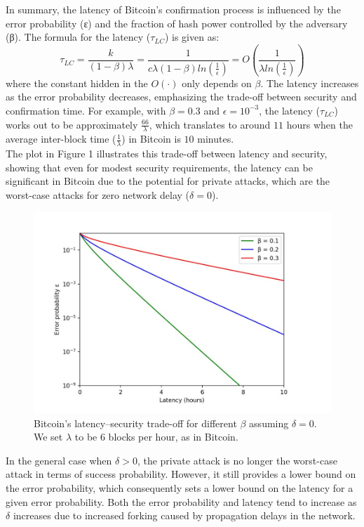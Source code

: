 In summary, the latency of Bitcoin's confirmation process is influenced by the error probability (ε) and the fraction of hash power controlled by the adversary (β). The formula for the latency ($\tau_{LC}$) is given as:
\begin{equation*}
	\tau_{LC} = \frac{k}{(1 - \beta)\lambda } = \frac{1}{c \lambda (1 - \beta) ln(\frac{1}{\epsilon})} = O(\frac{1}{\lambda ln(\frac{1}{\epsilon})})
\end{equation*}
where the constant hidden in the $O(·)$ only depends on $\beta$. The latency increases as the error probability decreases, emphasizing the trade-off between security and confirmation time.
For example, with $\beta = 0.3$ and $\epsilon = 10^{-3}$, the latency ($\tau_{LC}$) works out to be approximately $\frac{66}{\lambda}$, which translates to around $11$ hours when the average inter-block time ($\frac{1}{\lambda}$) in Bitcoin is $10$ minutes.\\
The plot in Figure 1 illustrates this trade-off between latency and security, showing that even for modest security requirements, the latency can be significant in Bitcoin due to the potential for private attacks, which are the worst-case attacks for zero network delay ($\delta = 0$).
\begin{center}
	\begin{figure}
		\centering
		\includegraphics[width=0.8\linewidth]{Fig/9/F1}
		\caption{Bitcoin’s latency–security trade-oﬀ for diﬀerent $\beta$ assuming $\delta = 0$. We set $\lambda$ to be $6$ blocks per hour, as in Bitcoin.}
		\label{fig:f1}
	\end{figure}
\end{center}
In the general case when $\delta > 0$, the private attack is no longer the worst-case attack in terms of success probability. However, it still provides a lower bound on the error probability, which consequently sets a lower bound on the latency for a given error probability. Both the error probability and latency tend to increase as $\delta$ increases due to increased forking caused by propagation delays in the network.\\
